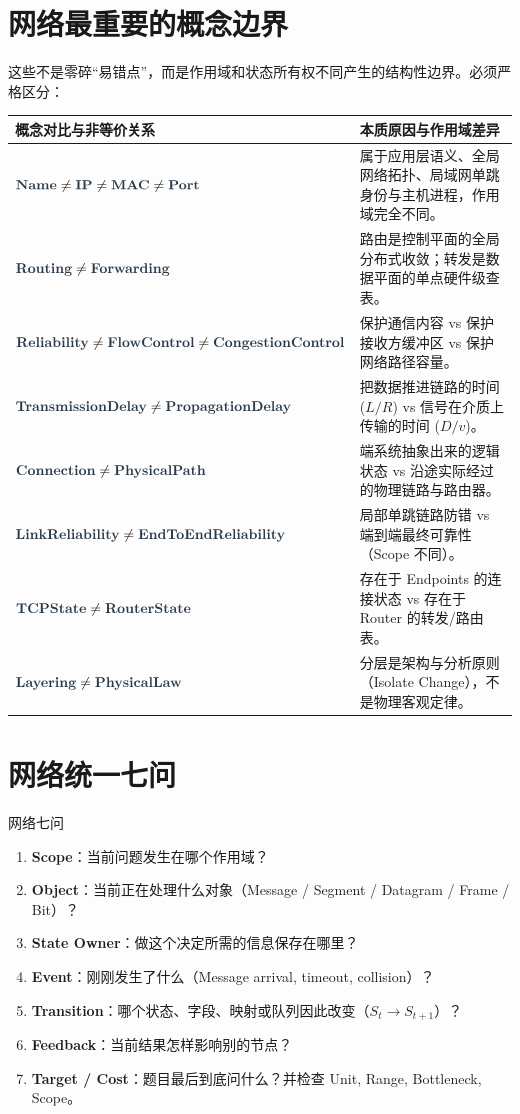 \documentclass[11pt,a4paper,openany]{ctexbook}
\newcommand{\key}[1]{\textbf{\color{deep}#1}}
\begin{document}
\section{网络最重要的概念边界}
这些不是零碎“易错点”，而是作用域和状态所有权不同产生的结构性边界。必须严格区分：

\begin{longtable}{p{4.8cm}p{\dimexpr\linewidth-5.67cm\relax}}
\toprule
\textbf{概念对比与非等价关系} & \textbf{本质原因与作用域差异}\\
\midrule
$\key{Name} \neq \key{IP} \neq \key{MAC} \neq \key{Port}$ & 属于应用层语义、全局网络拓扑、局域网单跳身份与主机进程，作用域完全不同。 \\
\midrule
$\key{Routing} \neq \key{Forwarding}$ & 路由是控制平面的全局分布式收敛；转发是数据平面的单点硬件级查表。 \\
\midrule
$\key{Reliability} \neq \key{FlowControl} \neq \key{CongestionControl}$ & 保护通信内容 vs 保护接收方缓冲区 vs 保护网络路径容量。 \\
\midrule
$\key{TransmissionDelay} \neq \key{PropagationDelay}$ & 把数据推进链路的时间 ($L/R$) vs 信号在介质上传输的时间 ($D/v$)。 \\
\midrule
$\key{Connection} \neq \key{PhysicalPath}$ & 端系统抽象出来的逻辑状态 vs 沿途实际经过的物理链路与路由器。 \\
\midrule
$\key{LinkReliability} \neq \key{EndToEndReliability}$ & 局部单跳链路防错 vs 端到端最终可靠性（Scope 不同）。 \\
\midrule
$\key{TCPState} \neq \key{RouterState}$ & 存在于 Endpoints 的连接状态 vs 存在于 Router 的转发/路由表。 \\
\midrule
$\key{Layering} \neq \key{PhysicalLaw}$ & 分层是架构与分析原则（Isolate Change），不是物理客观定律。 \\
\bottomrule
\end{longtable}

\section{网络统一七问}
\begin{examBox}{网络七问}
\begin{enumerate}
    \item \textbf{Scope}：当前问题发生在哪个作用域？
    \item \textbf{Object}：当前正在处理什么对象（Message / Segment / Datagram / Frame / Bit）？
    \item \textbf{State Owner}：做这个决定所需的信息保存在哪里？
    \item \textbf{Event}：刚刚发生了什么（Message arrival, timeout, collision）？
    \item \textbf{Transition}：哪个状态、字段、映射或队列因此改变（$S_t\rightarrow S_{t+1}$）？
    \item \textbf{Feedback}：当前结果怎样影响别的节点？
    \item \textbf{Target / Cost}：题目最后到底问什么？并检查 Unit, Range, Bottleneck, Scope。
\end{enumerate}
\end{examBox}
\end{document}
